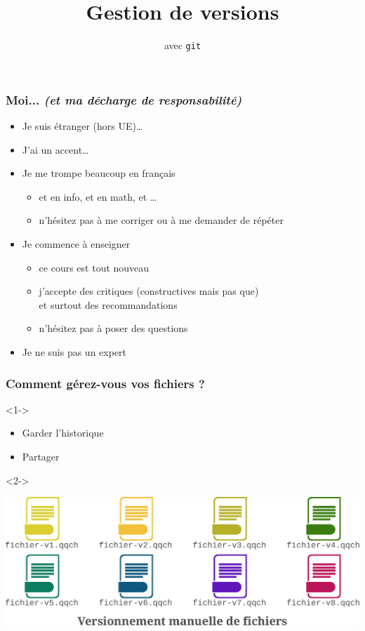 \documentclass[table,tikz,12pt,svgnames]{beamer}
\title{\LARGE Gestion de versions}
\subtitle{avec \texttt{git}}
\date{}
\begin{document}
\begin{frame}
	\titlepage
\end{frame}

\begin{frame}
	\frametitle{Moi... \textit{\small (et ma décharge de responsabilité)}}
	\begin{itemize}
		\item Je suis étranger (hors UE)…
		\item J'ai un accent…
		\item Je me {\color{blue} trompe beaucoup} en français
		\begin{itemize}
			\item et en info, et en math, et \ldots
			\item n'hésitez pas à me corriger ou à me demander de répéter
		\end{itemize}
		\item Je commence à enseigner
		\begin{itemize}
			\item ce cours est tout nouveau
			\item j'accepte des critiques (constructives mais pas que)\\
			et surtout des recommandations
			\item n'hésitez pas à poser des questions
		\end{itemize}
		\item Je ne suis pas un expert
	\end{itemize}
\end{frame}


\begin{frame}
	\frametitle{Comment gérez-vous vos fichiers ?}
	\vspace{-1em}
	\begin{block}{}<1->
	\begin{itemize}
		\item Garder l'historique
		\item Partager
	\end{itemize}
	\end{block}
	\vspace{-2em}
	\begin{block}{}<2->
    \begin{adjustwidth}{-0.5cm}{-0.5cm}{}
		\begin{center}	
		{\includegraphics[scale=0.5]{images/file_versions.pdf}}
		\end{center}
	\end{adjustwidth}
	\end{block}
\end{frame}
\end{document}
